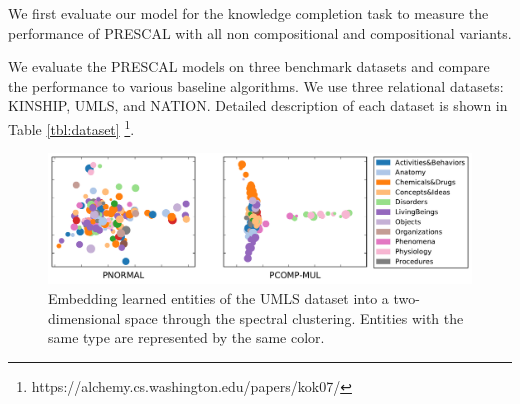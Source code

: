 
We first evaluate our model for the knowledge completion task
to measure the performance of PRESCAL with all non compositional and compositional variants.

We evaluate the PRESCAL models on three benchmark datasets and compare the performance to various baseline 
algorithms. We use three relational datasets: KINSHIP, UMLS, and NATION. Detailed description of each 
dataset is shown in Table \ref{tbl:dataset} \footnote{https://alchemy.cs.washington.edu/papers/kok07/}.

\begin{figure}[t]
	\centering
	
	\includegraphics[width=0.7\linewidth]{images/embedding_umls.pdf}	

	\caption{\label{fig:tsne} Embedding learned entities of the UMLS dataset into a two-dimensional space through the spectral clustering. Entities with the same type are represented by the same color.}
\end{figure}

